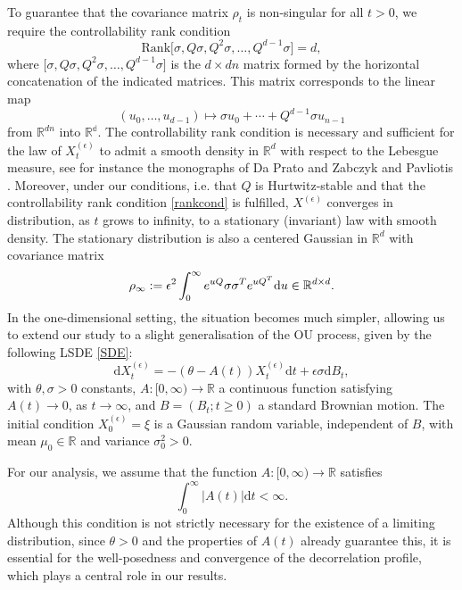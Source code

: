 \documentclass[12pt,thmsa]{article}
\newcommand{\ud}{\mathrm{d}}
\begin{document}
To guarantee that the covariance matrix $\rho_t$ is non-singular for all $t>0$, we require the  controllability rank condition
\begin{equation}\label{rankcond}
\mathrm{Rank}\Big[\sigma, Q\sigma, Q^2\sigma, \ldots, Q^{d-1}\sigma\Big]=d,
\end{equation}
where $\Big[\sigma, Q\sigma, Q^2\sigma, \ldots, Q^{d-1}\sigma\Big]$ is the $d\times d n$ matrix formed by the horizontal concatenation of the indicated matrices. This matrix corresponds to the linear map 
\[
(u_0, \ldots, u_{d-1})\mapsto \sigma u_0+\cdots +Q^{d-1}\sigma u_{n-1}
\]
from $\mathbb{R}^{dn}$ into $\mathbb{R^d}.$ The controllability rank condition is  necessary and sufficient for the law of $X^{(\epsilon)}_t$ to admit  a smooth density in $\mathbb{R}^d$ with respect to the Lebesgue measure, see for instance the monographs of Da Prato and Zabczyk \cite{DPZAB} and Pavliotis \cite{Pav}. Moreover, under our conditions, i.e. that $Q$ is Hurtwitz-stable and that the controllability rank condition \eqref{rankcond} is fulfilled, $X^{(\epsilon)}$ converges in distribution, as $t$ grows to infinity, to a stationary (invariant) law with smooth density. The stationary distribution  is  also a centered Gaussian in $\mathbb{R}^d$ with covariance matrix \[
\rho_\infty:=\epsilon^2\int_0^{\infty}e^{uQ}\sigma\sigma^T e^{uQ^T}{\rm d}u\in \mathbb{R}^{d\times d}.
\]
In the one-dimensional setting, the situation becomes much simpler, allowing us to extend our study to a slight generalisation of the OU process, given by the following LSDE 
\eqref{SDE}:
\begin{equation}\label{LSDE}
\ud X^{(\epsilon)}_t=-(\theta -A(t)) X^{(\epsilon)}_t\ud t+\epsilon \sigma \ud B_t, 
\end{equation}
with $\theta, \sigma>0$ constants, $A:[0,\infty)\to\mathbb{R}$ a continuous function satisfying $A(t)\to 0$, as $t\to \infty$, and  $B=(B_t; t\ge 0)$ a standard Brownian motion. The initial condition $X^{(\epsilon)}_0=\xi$ is a  Gaussian random variable, independent of $B$,   with mean $\mu_0\in \mathbb{R}$ and variance $\sigma_0^2>0$. 

For our analysis, we  assume that the function $A:[0,\infty)\to \mathbb{R}$ satisfies
\begin{equation}\label{hyp1}
\int_0^\infty|A(t)|\ud t <\infty.
\end{equation}
Although this condition is not strictly necessary for the existence of a limiting distribution, since $\theta>0$ and the properties of  $A(t)$  already guarantee this, it is essential for the well-posedness and convergence of the decorrelation profile, which  plays a central role in our results.
\end{document}
